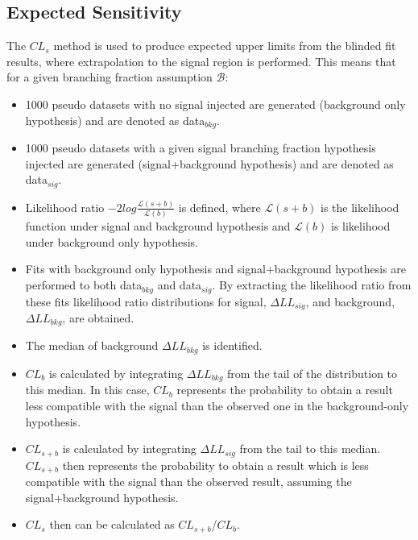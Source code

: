 \subsection{Expected Sensitivity}
\label{sensitivity}
The $CL_{s}$ method\cite{Read:2002hq} is used to produce expected upper limits from the blinded fit results, where extrapolation to the signal region is performed. This means that for a given branching fraction assumption $\mathcal{B}$:
\begin{itemize}
\item 1000 pseudo datasets with no signal injected are generated (background only hypothesis) and are denoted as data$_{bkg}$.
\item 1000 pseudo datasets with a given signal branching fraction hypothesis injected are generated (signal+background hypothesis) and are denoted as data$_{sig}$.
\item Likelihood ratio $-2 log \frac {\mathcal{L}(s+b)}{\mathcal{L}(b)}$ is defined, where $\mathcal{L}(s+b)$ is the likelihood function under signal and background hypothesis and $\mathcal{L}(b)$ is likelihood under background only hypothesis. 
\item Fits with background only hypothesis and signal+background hypothesis are performed to both data$_{bkg}$ and data$_{sig}$. By extracting the likelihood ratio from these fits likelihood ratio distributions for signal, $\Delta LL_{sig}$, and background, $\Delta LL_{bkg}$, are obtained.  
\item The median of background $\Delta LL_{bkg}$ is identified.
\item $CL_{b}$ is calculated by integrating $\Delta LL_{bkg}$ from the tail of the distribution to this median. In this case, $CL_{b}$ represents the probability to obtain a result less compatible with the signal than the observed one in the background-only hypothesis.
\item $CL_{s+b}$ is calculated by integrating  $\Delta LL_{sig}$ from the tail to this median. $CL_{s+b}$ then represents the probability to obtain a result which is less compatible with the signal than the observed result, assuming the signal+background hypothesis.
\item $CL_{s}$ then can be calculated as $CL_{s+b}$/$CL_b$.
\end{itemize}


